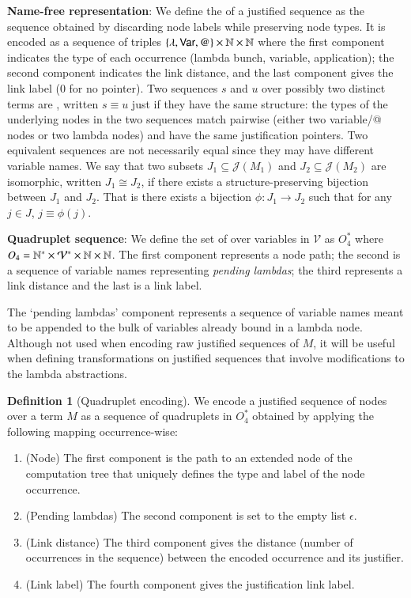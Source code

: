 \documentclass{elsarticle}
\theoremstyle{plain}
\theoremstyle{definition}
\newtheorem{definition}{Definition}[section]
\theoremstyle{remark}
\def\justseqset{\mathcal{J}}
\begin{document}
{\bf Name-free representation}: We define the  of a justified sequence as the sequence obtained by discarding node labels while preserving node types. It is encoded as a sequence of triples $\{\lambda, {\sf Var}, @ \}\times\mathbb{N}\times\mathbb{N}$ where the first component indicates the type of each occurrence (lambda bunch, variable, application); the second component indicates the link distance, and the last component gives the link label ($0$ for no pointer).
Two sequences $s$ and $u$ over possibly two distinct terms are , written $s \equiv u$ just if they have the same structure: the types of the underlying nodes in the two sequences match pairwise (either two variable/@ nodes or two lambda nodes) and have the same justification pointers. Two equivalent sequences are not necessarily equal since they may have different variable names.
We say that two subsets $J_1\subseteq \justseqset(M_1)$ and $J_2\subseteq\justseqset(M_2)$ are isomorphic, written $J_1\cong J_2$, if  there exists a structure-preserving bijection between $J_1$ and $J_2$. That is there exists a bijection $\phi :J_1\longrightarrow J_2$ such that for any $j\in J$, $j\equiv\phi(j)$.


{\bf Quadruplet sequence}:
We define the set of  over variables in $\mathcal{V}$ as $O_4^*$ where $O_4 = \mathbb{N}^*\times \mathcal{V}^* \times\mathbb{N}\times\mathbb{N}$. The first component represents a node path; the second is a sequence of variable names representing \emph{pending lambdas}; the third represents a link distance and the last is a link label.

The `pending lambdas' component represents a sequence of variable names meant to be appended to the bulk of variables already bound in a lambda node. Although not used when encoding raw justified sequences of $M$, it will be useful when defining transformations on justified sequences that involve modifications to the lambda abstractions.

\begin{definition}[Quadruplet encoding]
    \label{def:quadruplet_encoding}
    We encode a justified sequence of nodes over a term $M$
    as a sequence of quadruplets in $O_4^*$ obtained by applying the following mapping occurrence-wise:
    \begin{enumerate}[nosep]
        \item (Node) The first component is the path to an extended node of the computation tree that uniquely defines the type and label of the node occurrence.
        \item (Pending lambdas) The second component is set to the empty list $\epsilon$.
        \item (Link distance) The third component gives the distance (number of occurrences in the sequence) between the encoded occurrence and its justifier.
        \item (Link label) The fourth component gives the justification link label.
    \end{enumerate}
\end{definition}
\end{document}
